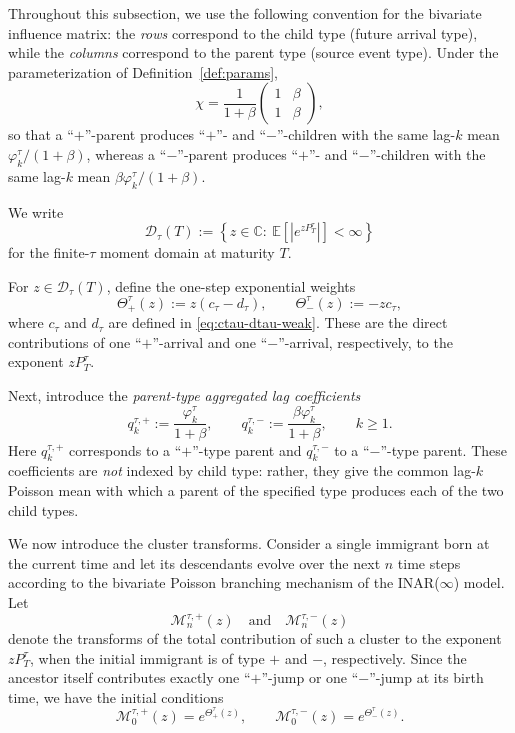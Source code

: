 \documentclass[letterpaper]{article}
\numberwithin{equation}{section}
\theoremstyle{definition}
\theoremstyle{remark}
\newcommand{\E}{\mathbb{E}}
\begin{document}
Throughout this subsection, we use the following convention for the bivariate influence matrix: the \emph{rows} correspond to the child type (future arrival type), while the \emph{columns} correspond to the parent type (source event type). Under the parameterization of Definition~\ref{def:params},
\[
  \chi=\frac1{1+\beta}
  \begin{pmatrix}
    1 & \beta\\
    1 & \beta
  \end{pmatrix},
\]
so that a ``$+$''-parent produces ``$+$''- and ``$-$''-children with the same lag-$k$ mean $\varphi_k^\tau/(1+\beta)$, whereas a ``$-$''-parent produces ``$+$''- and ``$-$''-children with the same lag-$k$ mean $\beta\varphi_k^\tau/(1+\beta)$.


We write
\[
  \mathcal D_\tau(T):=\left\{z\in\mathbb C:\ \E\left[\left|e^{zP_T^\tau}\right|\right]<\infty\right\}
\]
for the finite-$\tau$ moment domain at maturity $T$.

For $z\in\mathcal D_\tau(T)$, define the one-step exponential weights
\begin{equation}\label{eq:Theta-pm-exact}
  \Theta_+^\tau(z):=z(c_\tau-d_\tau),
  \qquad
  \Theta_-^\tau(z):=-zc_\tau,
\end{equation}
where $c_\tau$ and $d_\tau$ are defined in \eqref{eq:ctau-dtau-weak}.
These are the direct contributions of one ``$+$''-arrival and one ``$-$''-arrival, respectively, to the exponent $zP_T^\tau$.

Next, introduce the \emph{parent-type aggregated lag coefficients}
\begin{equation}\label{eq:q-pm-exact}
  q_k^{\tau,+}:=\frac{\varphi_k^\tau}{1+\beta},
  \qquad
  q_k^{\tau,-}:=\frac{\beta\varphi_k^\tau}{1+\beta},
  \qquad k\ge 1.
\end{equation}
Here $q_k^{\tau,+}$ corresponds to a ``$+$''-type parent and $q_k^{\tau,-}$ to a ``$-$''-type parent. These coefficients are \emph{not} indexed by child type: rather, they give the common lag-$k$ Poisson mean with which a parent of the specified type produces each of the two child types.

We now introduce the cluster transforms. Consider a single immigrant born at the current time and let its descendants evolve over the next $n$ time steps according to the bivariate Poisson branching mechanism of the INAR($\infty$) model. Let
\[
  \mathcal M_n^{\tau,+}(z)
  \quad\text{and}\quad
  \mathcal M_n^{\tau,-}(z)
\]
denote the transforms of the total contribution of such a cluster to the exponent $zP_T^\tau$, when the initial immigrant is of type $+$ and $-$, respectively. Since the ancestor itself contributes exactly one ``$+$''-jump or one ``$-$''-jump at its birth time, we have the initial conditions
\begin{equation}\label{eq:M0-exact}
  \mathcal M_0^{\tau,+}(z)=e^{\Theta_+^\tau(z)},
  \qquad
  \mathcal M_0^{\tau,-}(z)=e^{\Theta_-^\tau(z)}.
\end{equation}
\end{document}
